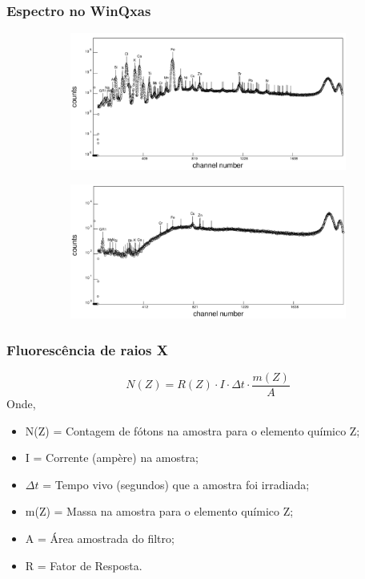 \begin{frame}
	\frametitle{Espectro no WinQxas}
\begin{figure}[H]
	\centering
	\begin{subfigure}[b]{0.7\textwidth}
		\includegraphics[width=\textwidth]{../../inputs/images/winqxas/GHA41editado.pdf}
	\end{subfigure}
	\begin{subfigure}[b]{0.7\textwidth}
		\includegraphics[width=\textwidth]{../../inputs/images/winqxas/GPE770editado.pdf}
	\end{subfigure}
\end{figure}
\end{frame}

\begin{frame}
  \frametitle{Fluorescência de raios X}
  \begin{equation*}
    \label{eq:contagem}
    N(Z) = R(Z) \cdot I \cdot \Delta t  \cdot \frac{m(Z)}{A}
  \end{equation*}
  Onde,  
  \begin{itemize}
    \item N(Z) = Contagem de fótons na amostra para o elemento químico Z;
    \item I = Corrente (ampère) na amostra;
    \item $\Delta t$ = Tempo vivo (segundos) que a amostra foi irradiada;
    \item m(Z) = Massa na amostra para o elemento químico Z;
    \item A = Área amostrada do filtro;
    \item R = Fator de Resposta.
  \end{itemize}
\end{frame}

